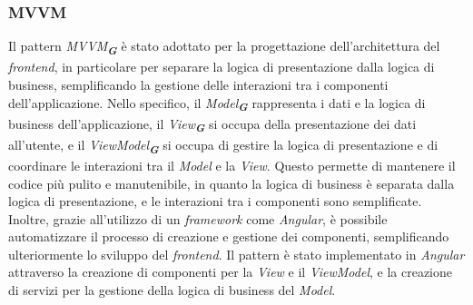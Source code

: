 \subsubsection{MVVM}
\label{sec:mvvm}

Il pattern \emph{MVVM}\textsubscript{\textbf{\textit{G}}} è stato adottato per la progettazione dell'architettura del \emph{frontend}, in particolare per separare la logica di presentazione dalla logica di business, semplificando la gestione delle interazioni tra i componenti dell'applicazione. Nello specifico, il \emph{Model}\textsubscript{\textbf{\textit{G}}} rappresenta i dati e la logica di business dell'applicazione, il \emph{View}\textsubscript{\textbf{\textit{G}}} si occupa della presentazione dei dati all'utente, e il \emph{ViewModel}\textsubscript{\textbf{\textit{G}}} si occupa di gestire la logica di presentazione e di coordinare le interazioni tra il \emph{Model} e la \emph{View}. Questo permette di mantenere il codice più pulito e manutenibile, in quanto la logica di business è separata dalla logica di presentazione, e le interazioni tra i componenti sono semplificate. Inoltre, grazie all'utilizzo di un \emph{framework} come \emph{Angular}, è possibile automatizzare il processo di creazione e gestione dei componenti, semplificando ulteriormente lo sviluppo del \emph{frontend}. Il pattern è stato implementato in \emph{Angular} attraverso la creazione di componenti per la \emph{View} e il \emph{ViewModel}, e la creazione di servizi per la gestione della logica di business del \emph{Model}.
